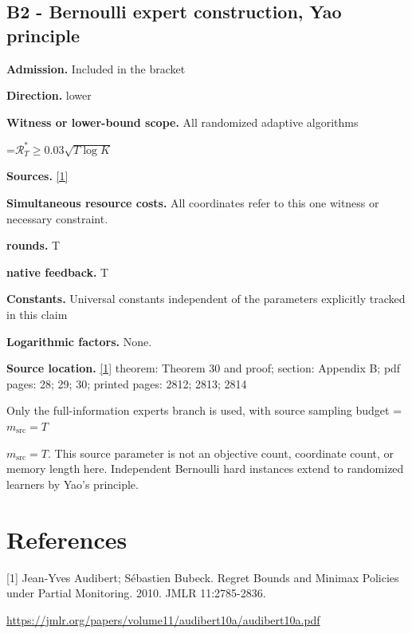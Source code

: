 \documentclass[10pt,a4paper]{article}
\newcommand{\AtlasMath}[1]{\par\begingroup\centering\setbox0=\hbox{$\displaystyle #1$}\ifdim\wd0>1.4\linewidth\typeout{ATLAS WIDE FORMULA: \the\wd0}\fi\ifdim\wd0>\linewidth\resizebox{\linewidth}{!}{\box0}\else\box0\fi\par\endgroup}
\newcommand{\AtlasInlineMath}[1]{\begingroup\setbox0=\hbox{$#1$}\ifdim\wd0>.4\linewidth\endgroup\AtlasMath{#1}\else\endgroup$#1$\fi}
\begin{document}
\subsection{B2 - Bernoulli expert construction, Yao principle}
\textbf{Admission.} Included in the bracket

\textbf{Direction.} lower

\textbf{Witness or lower-bound scope.} All randomized adaptive algorithms

\AtlasMath{\mathcal{R}_T^*\ge0.03\sqrt{T\log K}}
\textbf{Sources.} \href{https://jmlr.org/papers/volume11/audibert10a/audibert10a.pdf}{[1]}

\textbf{Simultaneous resource costs.} All coordinates refer to this one witness or necessary constraint.

\textbf{rounds.} T

\textbf{native feedback.} T

\textbf{Constants.} Universal constants independent of the parameters explicitly tracked in this claim

\textbf{Logarithmic factors.} None.

\textbf{Source location.} \href{https://jmlr.org/papers/volume11/audibert10a/audibert10a.pdf}{[1]} theorem: Theorem 30 and proof; section: Appendix B; pdf pages: 28; 29; 30; printed pages: 2812; 2813; 2814

Only the full-information experts branch is used, with source sampling budget \AtlasInlineMath{m_{\mathrm{src}}=T}. This source parameter is not an objective count, coordinate count, or memory length here. Independent Bernoulli hard instances extend to randomized learners by Yao's principle.

\section{References}
[1] Jean-Yves Audibert; Sébastien Bubeck. Regret Bounds and Minimax Policies under Partial Monitoring. 2010. JMLR 11:2785-2836.

\url{https://jmlr.org/papers/volume11/audibert10a/audibert10a.pdf}
\end{document}
